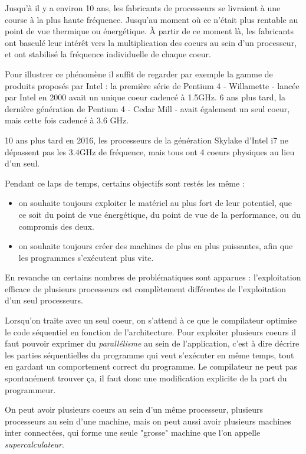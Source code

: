 Jusqu'à il y a environ 10 ans, les fabricants de processeurs se livraient à une course à la plus haute fréquence.
Jusqu'au moment où ce n'était plus rentable au point de vue thermique ou énergétique. À partir de ce moment là, les fabricants ont basculé leur intérêt vers la multiplication des coeurs au sein d'un processeur, et ont stabilisé la fréquence individuelle de chaque coeur.

Pour illustrer ce phénomène il suffit de regarder par exemple la gamme de produits proposés par Intel : la première série de Pentium 4 - Willamette - lancée par Intel en 2000 avait un unique coeur cadencé à 1.5GHz. 6 ans plus tard, la dernière génération de Pentium 4 - Cedar Mill - avait également un seul coeur, mais cette fois cadencé à 3.6 GHz.

10 ans plus tard en 2016, les processeurs de la génération Skylake d'Intel i7 ne dépassent pas les 3.4GHz de fréquence, mais tous ont 4 coeurs physiques au lieu d'un seul.

Pendant ce laps de temps, certains objectifs sont restés les même :
\begin{itemize}
  \item on souhaite toujours exploiter le matériel au plus fort de leur potentiel, que ce soit du point de vue énergétique, du point de vue de la performance, ou du compromis des deux.
  \item on souhaite toujours créer des machines de plus en plus puissantes, afin que les programmes s'exécutent plus vite.
\end{itemize}

En revanche un certains nombres de problématiques sont apparues : l'exploitation efficace de plusieurs processeurs est complètement différentes de l'exploitation d'un seul processeurs.

Lorsqu'on traite avec un seul coeur, on s'attend à ce que le compilateur optimise le code séquentiel en fonction de l'architecture.
Pour exploiter plusieurs coeurs il faut pouvoir exprimer du \emph{parallélisme} au sein de l'application, c'est à dire décrire les parties séquentielles du programme qui veut s'exécuter en même temps, tout en gardant un comportement correct du programme.
Le compilateur ne peut pas spontanément trouver ça, il faut donc une modification explicite de la part du programmeur.

On peut avoir plusieurs coeurs au sein d'un même processeur, plusieurs processeurs au sein d'une machine, mais on peut aussi avoir plusieurs machines inter connectées, qui forme une seule "grosse" machine que l'on appelle \emph{supercalculateur}.

